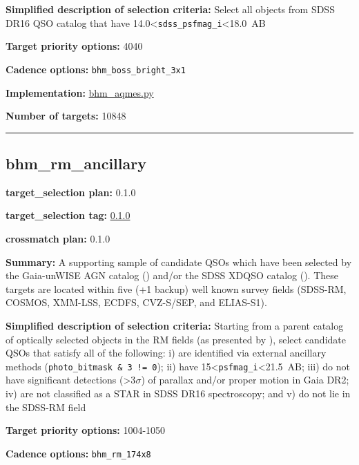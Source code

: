 \noindent\textbf{Simplified description of selection criteria:} Select all
objects from SDSS DR16 QSO catalog that have
14.0\textless{}\texttt{sdss\_psfmag\_i}\textless18.0~AB


\noindent\textbf{Target priority options:} 4040

\noindent\textbf{Cadence options:} \texttt{bhm\_boss\_bright\_3x1}

\noindent\textbf{Implementation:}
\href{https://github.com/sdss/target_selection/blob/0.1.0/python/target_selection/cartons/bhm_aqmes.py}{bhm\_aqmes.py}

\noindent\textbf{Number of targets:} 10848

\begin{center}\rule{0.5\linewidth}{0.5pt}\end{center}

\hypertarget{bhm_rm_ancillary_plan0.1.0}{%
\subsection{bhm\_rm\_ancillary}\label{bhm_rm_ancillary_plan0.1.0}}

\noindent\textbf{target\_selection plan:} 0.1.0

\noindent\textbf{target\_selection tag:}
\href{https://github.com/sdss/target_selection/tree/0.1.0/}{0.1.0}

\noindent\textbf{crossmatch plan:} 0.1.0

\noindent\textbf{Summary:} A supporting sample of candidate QSOs which have been
selected by the Gaia-unWISE AGN catalog
(\citealt{Shu2019}) and/or the SDSS XDQSO catalog
(\citealt{Bovy2011}). These targets are located within five (+1 backup) well
known survey fields (SDSS-RM, COSMOS, XMM-LSS, ECDFS, CVZ-S/SEP, and
ELIAS-S1).

\noindent\textbf{Simplified description of selection criteria:} Starting from a
parent catalog of optically selected objects in the RM fields (as
presented by
\citealt{Yang2022}), select candidate QSOs that satisfy all of the
following: i) are identified via external ancillary methods
(\texttt{photo\_bitmask\ \&\ 3\ !=\ 0}); ii) have
15\textless{}\texttt{psfmag\_i}\textless21.5~AB; iii) do not have
significant detections (\textgreater3$\sigma$) of parallax and/or proper motion
in Gaia DR2; iv) are not classified as a STAR in SDSS DR16 spectroscopy;
and v) do not lie in the SDSS-RM field


\noindent\textbf{Target priority options:} 1004-1050

\noindent\textbf{Cadence options:} \texttt{bhm\_rm\_174x8}

